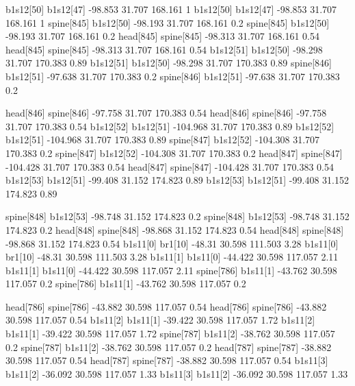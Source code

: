 b1s12[50]    b1s12[47]    -98.853    31.707    168.161    1
b1s12[50]    b1s12[47]    -98.853    31.707    168.161    1
spine[845]    b1s12[50]    -98.193    31.707    168.161    0.2
spine[845]    b1s12[50]    -98.193    31.707    168.161    0.2
head[845]    spine[845]    -98.313    31.707    168.161    0.54
head[845]    spine[845]    -98.313    31.707    168.161    0.54
b1s12[51]    b1s12[50]    -98.298    31.707    170.383    0.89
b1s12[51]    b1s12[50]    -98.298    31.707    170.383    0.89
spine[846]    b1s12[51]    -97.638    31.707    170.383    0.2
spine[846]    b1s12[51]    -97.638    31.707    170.383    0.2


head[846]    spine[846]    -97.758    31.707    170.383    0.54
head[846]    spine[846]    -97.758    31.707    170.383    0.54
b1s12[52]    b1s12[51]    -104.968    31.707    170.383    0.89
b1s12[52]    b1s12[51]    -104.968    31.707    170.383    0.89
spine[847]    b1s12[52]    -104.308    31.707    170.383    0.2
spine[847]    b1s12[52]    -104.308    31.707    170.383    0.2
head[847]    spine[847]    -104.428    31.707    170.383    0.54
head[847]    spine[847]    -104.428    31.707    170.383    0.54
b1s12[53]    b1s12[51]    -99.408    31.152    174.823    0.89
b1s12[53]    b1s12[51]    -99.408    31.152    174.823    0.89


spine[848]    b1s12[53]    -98.748    31.152    174.823    0.2
spine[848]    b1s12[53]    -98.748    31.152    174.823    0.2
head[848]    spine[848]    -98.868    31.152    174.823    0.54
head[848]    spine[848]    -98.868    31.152    174.823    0.54
b1s11[0]    br1[10]    -48.31    30.598    111.503    3.28
b1s11[0]    br1[10]    -48.31    30.598    111.503    3.28
b1s11[1]    b1s11[0]    -44.422    30.598    117.057    2.11
b1s11[1]    b1s11[0]    -44.422    30.598    117.057    2.11
spine[786]    b1s11[1]    -43.762    30.598    117.057    0.2
spine[786]    b1s11[1]    -43.762    30.598    117.057    0.2


head[786]    spine[786]    -43.882    30.598    117.057    0.54
head[786]    spine[786]    -43.882    30.598    117.057    0.54
b1s11[2]    b1s11[1]    -39.422    30.598    117.057    1.72
b1s11[2]    b1s11[1]    -39.422    30.598    117.057    1.72
spine[787]    b1s11[2]    -38.762    30.598    117.057    0.2
spine[787]    b1s11[2]    -38.762    30.598    117.057    0.2
head[787]    spine[787]    -38.882    30.598    117.057    0.54
head[787]    spine[787]    -38.882    30.598    117.057    0.54
b1s11[3]    b1s11[2]    -36.092    30.598    117.057    1.33
b1s11[3]    b1s11[2]    -36.092    30.598    117.057    1.33


